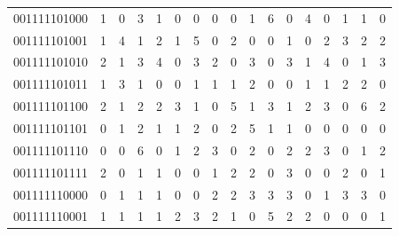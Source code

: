 \documentclass[10pt,a4paper]{article}
\begin{document}
\begin{longtable}{ |c|c|c|c|c|c|c|c|c|c|c|c|c|c|c|c|c| }
    001111101000              & 1                            & 0                                & 3                            & 1                              & 0   & 0   & 0   & 0   & 1   & 6   & 0   & 4   & 0   & 1   & 1   & 0   \\
    001111101001              & 1                            & 4                                & 1                            & 2                              & 1   & 5   & 0   & 2   & 0   & 0   & 1   & 0   & 2   & 3   & 2   & 2   \\
    001111101010              & 2                            & 1                                & 3                            & 4                              & 0   & 3   & 2   & 0   & 3   & 0   & 3   & 1   & 4   & 0   & 1   & 3   \\
    001111101011              & 1                            & 3                                & 1                            & 0                              & 0   & 1   & 1   & 1   & 2   & 0   & 0   & 1   & 1   & 2   & 2   & 0   \\
    001111101100              & 2                            & 1                                & 2                            & 2                              & 3   & 1   & 0   & 5   & 1   & 3   & 1   & 2   & 3   & 0   & 6   & 2   \\
    001111101101              & 0                            & 1                                & 2                            & 1                              & 1   & 2   & 0   & 2   & 5   & 1   & 1   & 0   & 0   & 0   & 0   & 0   \\
    001111101110              & 0                            & 0                                & 6                            & 0                              & 1   & 2   & 3   & 0   & 2   & 0   & 2   & 2   & 3   & 0   & 1   & 2   \\
    001111101111              & 2                            & 0                                & 1                            & 1                              & 0   & 0   & 1   & 2   & 2   & 0   & 3   & 0   & 0   & 2   & 0   & 1   \\
    001111110000              & 0                            & 1                                & 1                            & 1                              & 0   & 0   & 2   & 2   & 3   & 3   & 3   & 0   & 1   & 3   & 3   & 0   \\
    001111110001              & 1                            & 1                                & 1                            & 1                              & 2   & 3   & 2   & 1   & 0   & 5   & 2   & 2   & 0   & 0   & 0   & 1   \\

\end{longtable}
\end{document}
